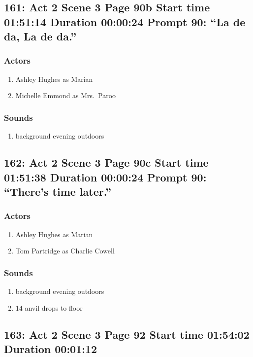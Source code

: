 \subsection{161: Act 2 Scene 3 Page 90b Start time 01:51:14 Duration 00:00:24 Prompt 90: ``La de da, La de da.''}

\subsubsection{Actors}
\begin{enumerate}
\item Ashley Hughes as Marian
\item Michelle Emmond as Mrs.~Paroo
\end{enumerate}

\subsubsection{Sounds}
\begin{enumerate}
\item background evening outdoors
\end{enumerate}
\subsection{162: Act 2 Scene 3 Page 90c Start time 01:51:38 Duration 00:00:24 Prompt 90: ``There's time later.''}

\subsubsection{Actors}
\begin{enumerate}
\item Ashley Hughes as Marian
\item Tom Partridge as Charlie Cowell
\end{enumerate}

\subsubsection{Sounds}
\begin{enumerate}
\item background evening outdoors
\item 14 anvil drops to floor
\end{enumerate}
\subsection{163: Act 2 Scene 3 Page 92 Start time 01:54:02 Duration 00:01:12}

